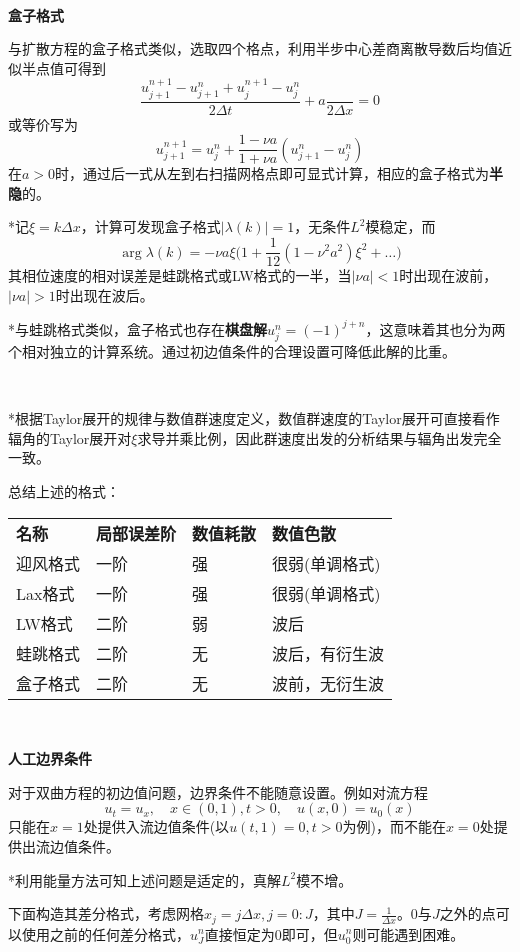 \documentclass[a4paper,UTF8,fontset=windows]{ctexart}
\begin{document}
\

\textbf{盒子格式}

与扩散方程的盒子格式类似，选取四个格点，利用半步中心差商离散导数后均值近似半点值可得到
$$\frac{u_{j+1}^{n+1}-u_{j+1}^n+u_j^{n+1}-u_j^n}{2\Delta t}+a\frac{}{2\Delta x}=0$$
或等价写为
$$u_{j+1}^{n+1}=u_j^n+\frac{1-\nu a}{1+\nu a}(u_{j+1}^n-u_j^n)$$
在$a>0$时，通过后一式从左到右扫描网格点即可显式计算，相应的盒子格式为\textbf{半隐}的。

*记$\xi=k\Delta x$，计算可发现盒子格式$|\lambda(k)|=1$，无条件$L^2$模稳定，而
$$\arg\lambda(k)=-\nu a\xi\bigg(1+\frac{1}{12}(1-\nu^2a^2)\xi^2+\dots\bigg)$$
其相位速度的相对误差是蛙跳格式或LW格式的一半，当$|\nu a|<1$时出现在波前，$|\nu a|>1$时出现在波后。

*与蛙跳格式类似，盒子格式也存在\textbf{棋盘解}$u_j^n=(-1)^{j+n}$，这意味着其也分为两个相对独立的计算系统。通过初边值条件的合理设置可降低此解的比重。

\

*根据Taylor展开的规律与数值群速度定义，数值群速度的Taylor展开可直接看作辐角的Taylor展开对$\xi$求导并乘比例，因此群速度出发的分析结果与辐角出发完全一致。

总结上述的格式：
\begin{center}
    \begin{tabular}{llll}
        \textbf{名称} & \textbf{局部误差阶} & \textbf{数值耗散} & \textbf{数值色散} \\
        迎风格式 & 一阶 & 强 & 很弱(单调格式) \\
        Lax格式 & 一阶 & 强 & 很弱(单调格式) \\
        LW格式 & 二阶 & 弱 & 波后 \\
        蛙跳格式 & 二阶 & 无 & 波后，有衍生波 \\
        盒子格式 & 二阶 & 无 & 波前，无衍生波
    \end{tabular}
\end{center}

\

\textbf{人工边界条件}

对于双曲方程的初边值问题，边界条件不能随意设置。例如对流方程
$$u_t=u_x,\quad x\in(0,1),t>0,\quad u(x,0)=u_0(x)$$
只能在$x=1$处提供入流边值条件(以$u(t,1)=0,t>0$为例)，而不能在$x=0$处提供出流边值条件。

*利用能量方法可知上述问题是适定的，真解$L^2$模不增。

下面构造其差分格式，考虑网格$x_j=j\Delta x,j=0:J$，其中$J=\frac{1}{\Delta x}$。0与$J$之外的点可以使用之前的任何差分格式，$u_J^n$直接恒定为0即可，但$u_0^n$则可能遇到困难。
\end{document}
